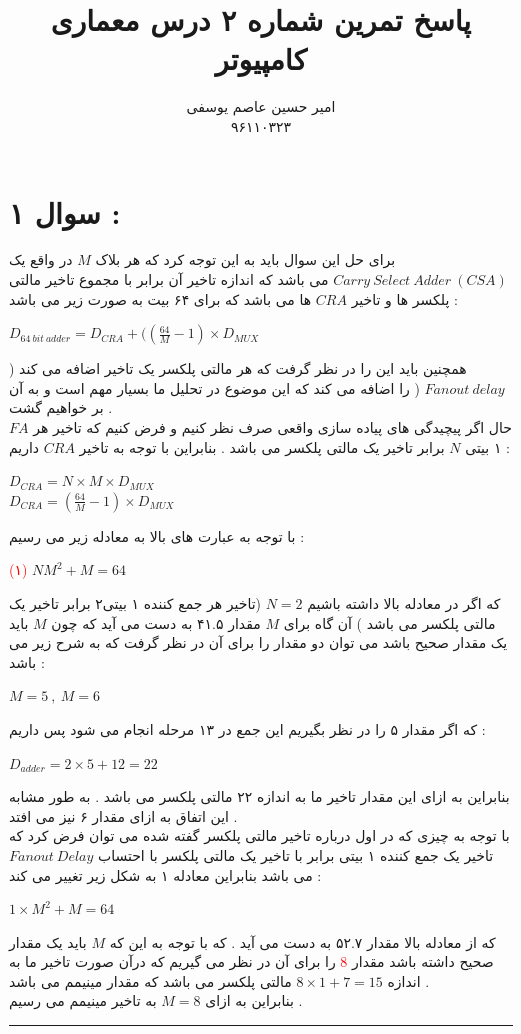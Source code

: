 \documentclass{article}
\title{پاسخ تمرین شماره ۲ درس معماری کامپیوتر}
\author{امیر حسین عاصم یوسفی \\ ۹۶۱۱۰۳۲۳}
\begin{document}
	\maketitle
	\section*{سوال ۱ : }
	برای حل این سوال باید به این توجه کرد که هر بلاک 
	$M$
	در واقع یک 
	$Carry \ Select \ Adder  \ (CSA)$
	می باشد که اندازه تاخیر آن برابر با مجموع تاخیر مالتی پلکسر ها و تاخیر 
	$CRA$
	ها می باشد که برای ۶۴ بیت به صورت زیر می باشد  : 
	\begin{center}
		$ D_{64\ bit\ adder } = D_{CRA} + ((\frac{64}{M}-1) \times D_{MUX}$
	\end{center}
همچنین باید این را در نظر گرفت که هر مالتی پلکسر یک تاخیر اضافه می کند (
$Fanout \ delay$
(
را اضافه می کند که این موضوع در تحلیل ما بسیار مهم است و به آن بر خواهیم گشت  . 
\\
حال اگر پیچیدگی های پیاده سازی واقعی صرف نظر کنیم و فرض کنیم که تاخیر هر 
$FA$
۱ بیتی 
$N$
برابر تاخیر یک مالتی پلکسر می باشد . بنابراین با توجه به تاخیر 
$CRA$
داریم  : 
\begin{center}
	$ D_{CRA} = N \times M \times D_{MUX}$\\
	$ D_{CRA } =(\frac{64}{M}-1) \times D_{MUX}$
\end{center}
با توجه به عبارت های بالا به معادله زیر می رسیم  : 
\begin{center}\textcolor{red}{(۱)}
	$NM^2 + M = 64$
\end{center}
که اگر در معادله بالا داشته باشیم 
$N=2$
(تاخیر هر جمع کننده ۱ بیتی۲ برابر تاخیر یک مالتی پلکسر می باشد ) آن گاه برای 
$M$
مقدار ۴۱.۵ به دست می آید که چون 
$M$
باید یک مقدار صحیح باشد می توان دو مقدار را برای آن در نظر گرفت که به شرح زیر می باشد  : 
\begin{center}
	$M = 5  \  , \ M = 6 $
\end{center}
که اگر مقدار ۵ را در نظر بگیریم این جمع در ۱۳ مرحله انجام می شود پس داریم : 
\begin{center}
	$D_{adder} = 2 \times 5  + 12  = 22 $
\end{center}
بنابراین به ازای این مقدار تاخیر ما به اندازه ۲۲ مالتی پلکسر می باشد . به طور مشابه این اتفاق به ازای مقدار ۶ نیز می افتد . \\
با توجه به چیزی که در اول درباره تاخیر مالتی پلکسر گفته شده می  توان فرض کرد که تاخیر یک جمع کننده ۱ بیتی برابر با تاخیر یک مالتی پلکسر با احتساب 
$Fanout \ Delay$
می باشد بنابراین معادله ۱ به شکل زیر تغییر می کند  : 
\begin{center}
	$1 \times M^2 + M = 64 $
\end{center}
که از معادله بالا مقدار ۵۲.۷ به دست می آید . که با توجه به این که 
$M$
باید یک مقدار صحیح داشته باشد مقدار 
\textcolor{red}{8}
را برای آن در نظر می گیریم که درآن صورت تاخیر ما به اندازه 
$8 \times 1  + 7  = 15$
مالتی پلکسر می باشد که مقدار مینیمم می باشد . \\
بنابراین به ازای 
$M = 8 $
به تاخیر مینیمم می رسیم  . 
\hrule
\end{document}
